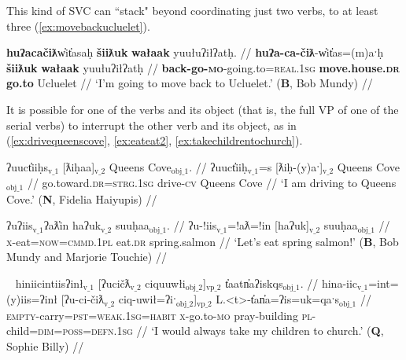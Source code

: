 This kind of SVC can ``stack" beyond coordinating just two verbs, to at least three (\ref{ex:movebackucluelet}).

\begin{comment}
\ex \label{ex:onlygotostore}
\begingl
\glpreamble \textbf{ʔanasiła}ʔi \textbf{kuw̓iła} \textbf{ʔucačiƛ} makuwił. //
\gla \textbf{ʔana-siła}=!iˑ \textbf{kuw̓iła} \textbf{ʔu-ca-čiƛ} makuwił //
\glb \textbf{only-do}=\textsc{cmmd.2sg} \textbf{go.ahead} \textbf{\textsc{x}-go.to-\textsc{mo}} store //
\glft `Just go to the store.' (\textbf{C}, \textit{tupaat} Julia Lucas) //
\endgl
\xe
\end{comment}

\ex \label{ex:movebackucluelet}
\begingl
\glpreamble \textbf{huʔacačiƛ}w̓it̓asaḥ \textbf{šiiƛuk} \textbf{wałaak} yuułuʔiłʔatḥ. //
\gla \textbf{huʔa-ca-čiƛ}-w̓it̓as=(m)aˑḥ \textbf{šiiƛuk} \textbf{wałaak} yuułuʔiłʔatḥ //
\glb \textbf{back-go-\textsc{mo}}-going.to=\textsc{real.1sg} \textbf{move.house.\textsc{dr}} \textbf{go.to} Ucluelet //
\glft `I'm going to move back to Ucluelet.' (\textbf{B}, Bob Mundy) //
\endgl
\xe

It is possible for one of the verbs and its object (that is, the full VP of one of the serial verbs) to interrupt the other verb and its object, as in (\ref{ex:drivequeenscove}, \ref{ex:eateat2}, \ref{ex:takechildrentochurch}).

\ex \label{ex:drivequeenscove}
\begingl
\glpreamble ʔuuct̓iiḥs$_{\text{v\_1}}$ [ƛiḥaa]$_{\text{v\_2}}$ Queens Cove$_{\text{obj\_1}}$. //
\gla ʔuuct̓iiḥ$_{\text{v\_1}}$=s [ƛiḥ-(y)aˑ]$_{\text{v\_2}}$ Queens Cove$_{\text{obj\_1}}$ //
\glb go.toward.\textsc{dr}=\textsc{strg.1sg} drive-\textsc{cv} Queens Cove //
\glft `I am driving to Queens Cove.' (\textbf{N}, Fidelia Haiyupis) //
\endgl
\xe

\ex \label{ex:eateat2}
\begingl
\glpreamble ʔuʔiis$_{\text{v\_1}}$ʔaƛ̓in haʔuk$_{\text{v\_2}}$ suuḥaa$_{\text{obj\_1}}$. //
\gla ʔu-!iis$_{\text{v\_1}}$=!aƛ=!in [haʔuk]$_{\text{v\_2}}$ suuḥaa$_{\text{obj\_1}}$ //
\glb \textsc{x}-eat=\textsc{now}=\textsc{cmmd.1pl} eat.\textsc{dr} spring.salmon //
\glft `Let's eat spring salmon!' (\textbf{B}, Bob Mundy and Marjorie Touchie) //
\endgl
\xe

\ex~ \label{ex:takechildrentochurch}
\begingl
\glpreamble hiniicintiisʔinł$_{\text{v\_1}}$ [ʔucičƛ$_{\text{v\_2}}$ ciquuwłi$_{\text{obj\_2}}$]$_{\text{vp\_2}}$ t̓aatn̓aʔiskqs$_{\text{obj\_1}}$. //
\gla hina-iic$_{\text{v\_1}}$=int=(y)iis=ʔinł [ʔu-ci-čiƛ$_{\text{v\_2}}$ ciq-uwił=ʔiˑ$_{\text{obj\_2}}$]$_{\text{vp\_2}}$ L.<t>-t̓an̓a=ʔis=uk=qaˑs$_{\text{obj\_1}}$  //
\glb \textsc{empty}-carry=\textsc{pst}=\textsc{weak.1sg}=\textsc{habit} \textsc{x}-go.to-\textsc{mo} pray-building \textsc{pl}-child=\textsc{dim}=\textsc{poss}=\textsc{defn.1sg} //
\glft `I would always take my children to church.' (\textbf{Q}, Sophie Billy) //
\endgl
\xe


